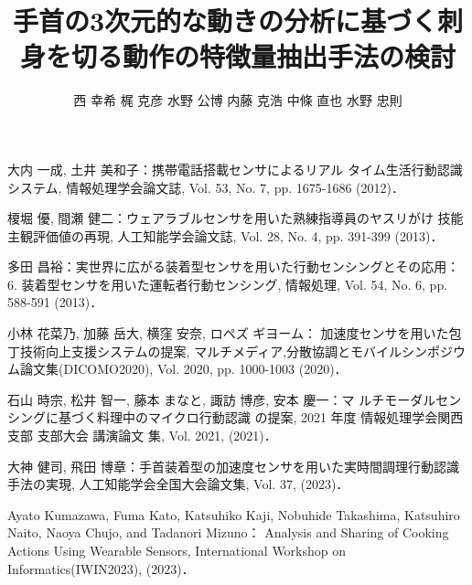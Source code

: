 \documentclass[a4j,8pt,twocolumn]{extarticle}
\title{手首の3次元的な動きの分析に基づく刺身を切る動作の特徴量抽出手法の検討}
\author{西 幸希\DAG{1} \qquad 梶 克彦\DAG{1} \qquad 水野 公博\DAG{2} \qquad 内藤 克浩\DAG{1} \qquad 中條 直也\DAG{1} \qquad 水野 忠則\DAG{1}}
\affiliation{\DAG{1}愛知工業大学情報科学部 \qquad \DAG{2}三菱電機エンジニアリング株式会社}
\begin{document}
	
\maketitle
\thispagestyle{empty}	%





\begin{thebibliography}{9}
大内 一成, 土井 美和子：携帯電話搭載センサによるリアル
タイム生活行動認識システム, 情報処理学会論文誌, Vol. 53,
No. 7, pp. 1675-1686 (2012)．

榎堀 優, 間瀬 健二：ウェアラブルセンサを用いた熟練指導員のヤスリがけ
技能主観評価値の再現, 人工知能学会論文誌, Vol. 28, No. 4, pp. 391-399 (2013)．

多田 昌裕：実世界に広がる装着型センサを用いた行動センシングとその応用：6. 装着型センサを用いた運転者行動センシング, 情報処理, Vol. 54, No. 6, pp. 588-591 (2013)．

小林 花菜乃, 加藤 岳大, 横窪 安奈, ロペズ ギヨーム：
加速度センサを用いた包丁技術向上支援システムの提案, マルチメディア,分散協調とモバイルシンポジウム論文集(DICOMO2020), Vol. 2020, pp. 1000-1003 (2020)．

石山 時宗, 松井 智一, 藤本 まなと, 諏訪 博彦, 安本 慶一：マ
ルチモーダルセンシングに基づく料理中のマイクロ行動認識
の提案, 2021 年度 情報処理学会関西支部 支部大会 講演論文
集, Vol. 2021, (2021)．

大神 健司, 飛田 博章：手首装着型の加速度センサを用いた実時間調理行動認識手法の実現,
 人工知能学会全国大会論文集, Vol. 37, (2023)．

Ayato Kumazawa, Fuma Kato, Katsuhiko Kaji, Nobuhide Takashima, Katsuhiro Naito, Naoya Chujo, and Tadanori Mizuno：
Analysis and Sharing of Cooking Actions Using Wearable Sensors, International Workshop on Informatics(IWIN2023), (2023)．
 

\end{thebibliography}


\end{document}

